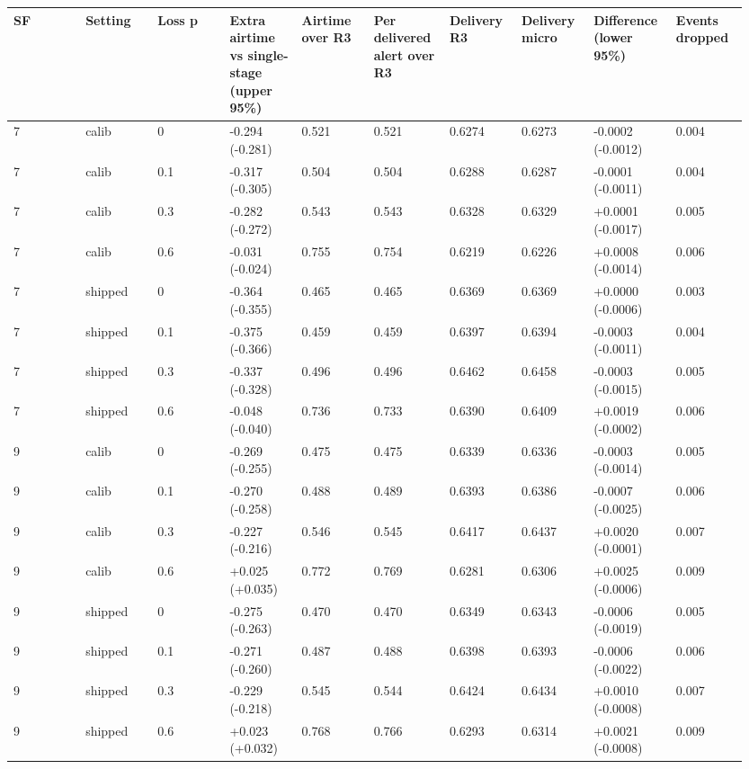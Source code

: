 {\scriptsize\raggedright
\begin{longtable}{p{0.095\linewidth}p{0.095\linewidth}p{0.095\linewidth}p{0.095\linewidth}p{0.095\linewidth}p{0.095\linewidth}p{0.095\linewidth}p{0.095\linewidth}p{0.095\linewidth}p{0.095\linewidth}}
\toprule
SF & Setting & Loss p & Extra airtime vs single-stage (upper 95\%) & Airtime over R3 & Per delivered alert over R3 & Delivery R3 & Delivery micro & Difference (lower 95\%) & Events dropped \\
\midrule
\endhead
7 & calib & 0 & -0.294 (-0.281) & 0.521 & 0.521 & 0.6274 & 0.6273 & -0.0002 (-0.0012) & 0.004 \\
7 & calib & 0.1 & -0.317 (-0.305) & 0.504 & 0.504 & 0.6288 & 0.6287 & -0.0001 (-0.0011) & 0.004 \\
7 & calib & 0.3 & -0.282 (-0.272) & 0.543 & 0.543 & 0.6328 & 0.6329 & +0.0001 (-0.0017) & 0.005 \\
7 & calib & 0.6 & -0.031 (-0.024) & 0.755 & 0.754 & 0.6219 & 0.6226 & +0.0008 (-0.0014) & 0.006 \\
7 & shipped & 0 & -0.364 (-0.355) & 0.465 & 0.465 & 0.6369 & 0.6369 & +0.0000 (-0.0006) & 0.003 \\
7 & shipped & 0.1 & -0.375 (-0.366) & 0.459 & 0.459 & 0.6397 & 0.6394 & -0.0003 (-0.0011) & 0.004 \\
7 & shipped & 0.3 & -0.337 (-0.328) & 0.496 & 0.496 & 0.6462 & 0.6458 & -0.0003 (-0.0015) & 0.005 \\
7 & shipped & 0.6 & -0.048 (-0.040) & 0.736 & 0.733 & 0.6390 & 0.6409 & +0.0019 (-0.0002) & 0.006 \\
9 & calib & 0 & -0.269 (-0.255) & 0.475 & 0.475 & 0.6339 & 0.6336 & -0.0003 (-0.0014) & 0.005 \\
9 & calib & 0.1 & -0.270 (-0.258) & 0.488 & 0.489 & 0.6393 & 0.6386 & -0.0007 (-0.0025) & 0.006 \\
9 & calib & 0.3 & -0.227 (-0.216) & 0.546 & 0.545 & 0.6417 & 0.6437 & +0.0020 (-0.0001) & 0.007 \\
9 & calib & 0.6 & +0.025 (+0.035) & 0.772 & 0.769 & 0.6281 & 0.6306 & +0.0025 (-0.0006) & 0.009 \\
9 & shipped & 0 & -0.275 (-0.263) & 0.470 & 0.470 & 0.6349 & 0.6343 & -0.0006 (-0.0019) & 0.005 \\
9 & shipped & 0.1 & -0.271 (-0.260) & 0.487 & 0.488 & 0.6398 & 0.6393 & -0.0006 (-0.0022) & 0.006 \\
9 & shipped & 0.3 & -0.229 (-0.218) & 0.545 & 0.544 & 0.6424 & 0.6434 & +0.0010 (-0.0008) & 0.007 \\
9 & shipped & 0.6 & +0.023 (+0.032) & 0.768 & 0.766 & 0.6293 & 0.6314 & +0.0021 (-0.0008) & 0.009 \\
\bottomrule
\end{longtable}}

